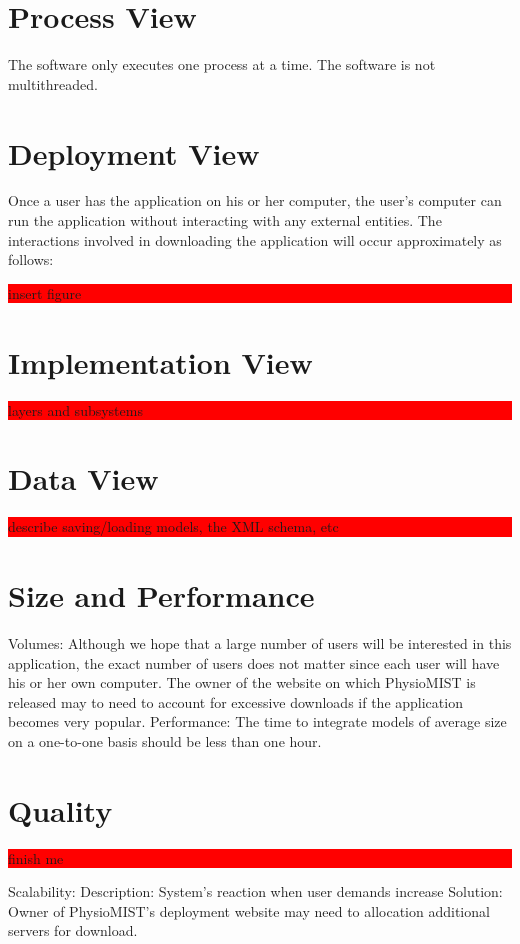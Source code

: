 \documentclass{article}
\newcommand{\todo}[1]{\colorbox{red}{\begin{minipage}{\textwidth}{#1}\end{minipage}}}
\begin{document}
\section{Process View}
The software only executes one process at a time. The software is not multithreaded.

\section{Deployment View}
Once a user has the application on his or her computer, the user's computer can run the application without interacting with any external entities.
The interactions involved in downloading the application will occur approximately as follows:
\todo{insert figure} 

\section{Implementation View}
\todo{layers and subsystems}

\section{Data View}
\todo{describe saving/loading models, the XML schema, etc}

\section{Size and Performance}
Volumes:
\newline
Although we hope that a large number of users will be interested in this application, the exact number of users does not matter since each user will have his or her own computer.  The owner of the website on which PhysioMIST is released may to need to account for excessive downloads if the application becomes very popular.
Performance:
\newline
The time to integrate models of average size on a one-to-one basis should be less than one hour.

\section{Quality}
\todo{finish me}
Scalability:
\newline
Description:  System's reaction when user demands increase
Solution:  Owner of PhysioMIST's deployment website may need to allocation additional servers for download.
\end{document}
